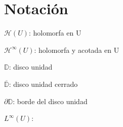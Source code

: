 \chapter{Notación}

$\mathcal{H}(U)$: holomorfa en U

$\mathcal{H}^{\infty}(U)$: holomorfa y acotada en U

$\mathbb{D}$: disco unidad

$\overline{\mathbb{D}}$: disco unidad cerrado

$\partial \mathbb{D}$: borde del disco unidad

$L^{\infty}(U)$:

